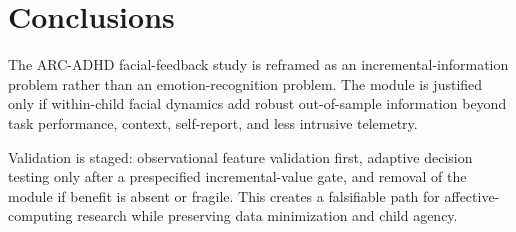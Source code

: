 \section{Conclusions}

The ARC-ADHD facial-feedback study is reframed as an incremental-information problem rather than an emotion-recognition problem. The module is justified only if within-child facial dynamics add robust out-of-sample information beyond task performance, context, self-report, and less intrusive telemetry.

Validation is staged: observational feature validation first, adaptive decision testing only after a prespecified incremental-value gate, and removal of the module if benefit is absent or fragile. This creates a falsifiable path for affective-computing research while preserving data minimization and child agency.
